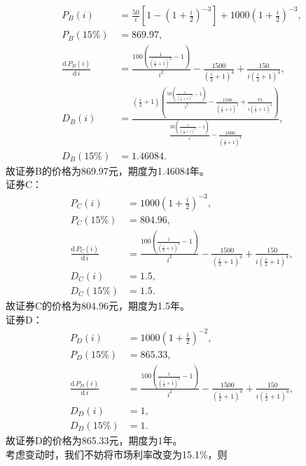 \begin{enumerate}
\begin{align*}
        P_B(i) & = \frac{50}{i} \left[1 - \left(1 + \frac{i}{2}\right)^{-3}\right] + 1000\left(1 + \frac{i}{2}\right)^{-3},\\
        P_B(15\%) & = 869.97,\\
        \frac{\mathrm{d}\, P_B(i)}{\mathrm{d} \, i} & = \frac{100 \left(\frac{1}{{\left(\frac{i}{2} + 1\right)}^3} - 1\right)}{i^2} - \frac{1500}{{\left(\frac{i}{2} + 1\right)}^4} + \frac{150}{i {\left(\frac{i}{2} + 1\right)}^4},\\
        D_B(i) & = \frac{\left(\frac{i}{2} + 1\right) \left(\frac{50 \left(\frac{1}{{\left(\frac{i}{2} + 1\right)}^3} - 1\right)}{i^2} - \frac{1500}{{\left(\frac{i}{2} + 1\right)}^4} + \frac{75}{i {\left(\frac{i}{2} + 1\right)}^4}\right)}{\frac{50 \left(\frac{1}{{\left(\frac{i}{2} + 1\right)}^3} - 1\right)}{i} - \frac{1000}{{\left(\frac{i}{2} + 1\right)}^3}},\\
        D_B(15\%) & = 1.46084.
    \end{align*}
    故证券B的价格为869.97元，期度为1.46084年。\\
    证券C：
    \begin{align*}
        P_C(i) & = 1000\left(1 + \frac{i}{2}\right)^{-3},\\
        P_C(15\%) & = 804.96,\\
        \frac{\mathrm{d}\, P_C(i)}{\mathrm{d} \, i} & = \frac{100 \left(\frac{1}{{\left(\frac{i}{2} + 1\right)}^3} - 1\right)}{i^2} - \frac{1500}{{\left(\frac{i}{2} + 1\right)}^4} + \frac{150}{i {\left(\frac{i}{2} + 1\right)}^4},\\
        D_C(i) & = 1.5,\\
        D_C(15\%) & = 1.5.
    \end{align*}
    故证券C的价格为804.96元，期度为1.5年。\\
    证券D：
    \begin{align*}
        P_D(i) & = 1000\left(1 + \frac{i}{2}\right)^{-2},\\
        P_D(15\%) & = 865.33,\\
        \frac{\mathrm{d}\, P_D(i)}{\mathrm{d} \, i} & = \frac{100 \left(\frac{1}{{\left(\frac{i}{2} + 1\right)}^3} - 1\right)}{i^2} - \frac{1500}{{\left(\frac{i}{2} + 1\right)}^4} + \frac{150}{i {\left(\frac{i}{2} + 1\right)}^4},\\
        D_D(i) & = 1,\\
        D_D(15\%) & = 1.
    \end{align*}
    故证券D的价格为865.33元，期度为1年。\\
    考虑变动时，我们不妨将市场利率改变为15.1\%，则

\end{enumerate}
